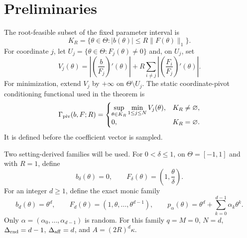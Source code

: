 \section{Preliminaries}

The root-feasible subset of the fixed parameter interval is
\[
K_R=\{\theta\in\Theta:|b(\theta)|\leq R\|F(\theta)\|_1\}.
\]
For coordinate $j$, let $U_j=\{\theta\in\Theta:F_j(\theta)\neq0\}$ and,
on $U_j$, set
\[
V_j(\theta)
=\left|\left(\frac b{F_j}\right)'(\theta)\right|
 +R\sum_{i\neq j}
  \left|\left(\frac{F_i}{F_j}\right)'(\theta)\right|.
\]
For minimization, extend $V_j$ by $+\infty$ on $\Theta\setminus U_j$.
The static coordinate-pivot conditioning functional used in the theorem is
\[
\Gamma_{\rm piv}(b,F;R)=
\begin{cases}
\displaystyle\sup_{\theta\in K_R}\min_{1\leq j\leq N}V_j(\theta),
&K_R\neq\varnothing,\\[1ex]
0,&K_R=\varnothing.
\end{cases}
\]
It is defined before the coefficient vector is sampled.

Two setting-derived families will be used.  For $0<\delta\leq1$, on
$\Theta=[-1,1]$ and with $R=1$, define
\[
b_\delta(\theta)=0,
\qquad
F_\delta(\theta)=\left(1,\frac\theta\delta\right).
\]
For an integer $d\geq1$, define the exact monic family
\[
b_d(\theta)=\theta^d,
\qquad
F_d(\theta)=(1,\theta,\ldots,\theta^{d-1}),
\qquad
p_\alpha(\theta)=\theta^d+\sum_{k=0}^{d-1}\alpha_k\theta^k.
\]
Only $\alpha=(\alpha_0,\ldots,\alpha_{d-1})$ is random.  For this family
$q=M=0$, $N=d$, $\Delta_{\rm rnd}=d-1$,
$\Delta_{\rm aff}=d$, and $A=(2R)^d\kappa$.
